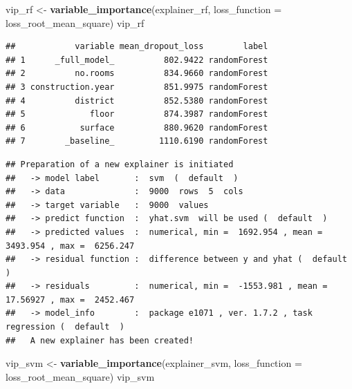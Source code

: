 \documentclass[12pt,]{krantz}
\newenvironment{Shaded}{\begin{snugshade}}{\end{snugshade}}
\newcommand{\DataTypeTok}[1]{\textcolor[rgb]{0.13,0.29,0.53}{#1}}
\newcommand{\DecValTok}[1]{\textcolor[rgb]{0.00,0.00,0.81}{#1}}
\newcommand{\KeywordTok}[1]{\textcolor[rgb]{0.13,0.29,0.53}{\textbf{#1}}}
\newcommand{\NormalTok}[1]{#1}
\newcommand{\OperatorTok}[1]{\textcolor[rgb]{0.81,0.36,0.00}{\textbf{#1}}}
\newcommand{\OtherTok}[1]{\textcolor[rgb]{0.56,0.35,0.01}{#1}}
\newcommand{\StringTok}[1]{\textcolor[rgb]{0.31,0.60,0.02}{#1}}
\begin{document}
\begin{Shaded}
\begin{Highlighting}[]
\NormalTok{vip_rf <-}\StringTok{ }\KeywordTok{variable_importance}\NormalTok{(explainer_rf, }
            \DataTypeTok{loss_function =}\NormalTok{ loss_root_mean_square)}
\NormalTok{vip_rf}
\end{Highlighting}
\end{Shaded}

\begin{verbatim}
##            variable mean_dropout_loss        label
## 1      _full_model_          802.9422 randomForest
## 2          no.rooms          834.9660 randomForest
## 3 construction.year          851.9975 randomForest
## 4          district          852.5380 randomForest
## 5             floor          874.3987 randomForest
## 6           surface          880.9620 randomForest
## 7        _baseline_         1110.6190 randomForest
\end{verbatim}

\begin{Shaded}
\end{Shaded}

\begin{verbatim}
## Preparation of a new explainer is initiated
##   -> model label       :  svm  (  default  )
##   -> data              :  9000  rows  5  cols 
##   -> target variable   :  9000  values 
##   -> predict function  :  yhat.svm  will be used (  default  )
##   -> predicted values  :  numerical, min =  1692.954 , mean =  3493.954 , max =  6256.247  
##   -> residual function :  difference between y and yhat (  default  )
##   -> residuals         :  numerical, min =  -1553.981 , mean =  17.56927 , max =  2452.467  
##   -> model_info        :  package e1071 , ver. 1.7.2 , task regression (  default  ) 
##   A new explainer has been created!
\end{verbatim}

\begin{Shaded}
\begin{Highlighting}[]
\NormalTok{vip_svm <-}\StringTok{ }\KeywordTok{variable_importance}\NormalTok{(explainer_svm, }
            \DataTypeTok{loss_function =}\NormalTok{ loss_root_mean_square)}
\NormalTok{vip_svm}
\end{Highlighting}
\end{Shaded}
\end{document}

